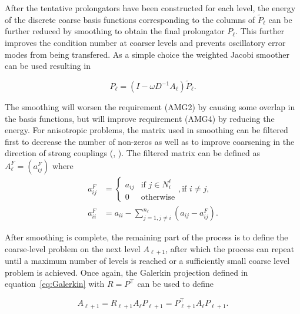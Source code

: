 After the tentative prolongators have been constructed for each level, the energy of the discrete coarse basis functions corresponding to the columns of $\tilde{P}_\ell$ can be further reduced by smoothing to obtain the final prolongator $P_\ell$. This further improves the condition number at coarser levels and prevents oscillatory error modes from being transfered. As a simple choice the weighted Jacobi smoother can be used resulting in

\begin{equation}
	\label{eq:P_smoothing}
	P_\ell = (I - \omega D^{-1}A_\ell)\tilde{P}_\ell.
\end{equation}

The smoothing will worsen the requirement (AMG2) by causing some overlap in the basis functions, but will improve requirement (AMG4) by reducing the energy. For anisotropic problems, the matrix used in smoothing can be filtered first to decrease the number of non-zeros as well as to improve coarsening in the direction of strong couplings (\cite{Gee2009}, \cite{Vanek1996}). The filtered matrix can be defined as $A_\ell^F = \left(a_{ij}^F\right)$ where
\begin{equation}
	\begin{aligned}
	a_{ij}^F &=
	\begin{cases}
		a_{ij} & \text{if $j \in N_i^\ell$} \\
		0 & \text{otherwise}
	\end{cases}, \text{if $i \neq j$}, \\
	a_{ii}^F & =  a_{ii} - \displaystyle \sum_{j=1, j\neq i}^{n_\ell}{\left(a_{ij} - a_{ij}^F\right)}.
	\end{aligned}
\end{equation}

After smoothing is complete, the remaining part of the process is to define the coarse-level problem on the next level $A_{\ell+1}$, after which the process can repeat until a maximum number of levels is reached or a sufficiently small coarse level problem is achieved. Once again, the Galerkin projection defined in equation~\ref{eq:Galerkin} with $R = P^\top$ can be used to define

\begin{equation}
	A_{\ell+1} = R_{\ell+1} A_\ell P_{\ell+1} = P_{\ell+1}^\top A_\ell P_{\ell+1}.
\end{equation}


